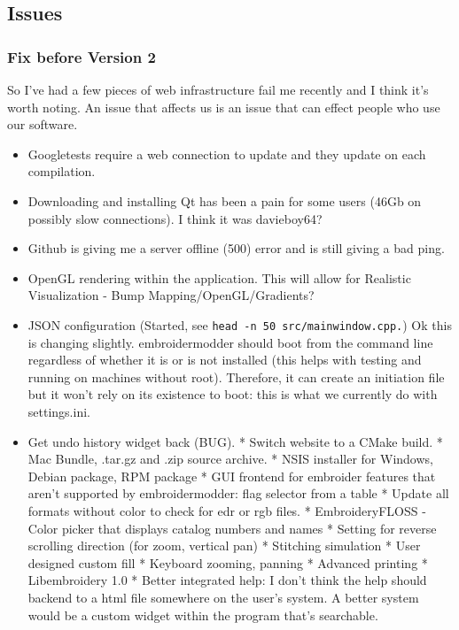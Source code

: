 \documentclass[10pt]{report}
\begin{document}
\subsection{Issues}

\subsubsection{Fix before Version 2}

So I've had a few pieces of web infrastructure fail me recently and I
think it's worth noting. An issue that affects us is an issue that can
effect people who use our software.

\begin{itemize}
\item Googletests require a web connection to update and they update on each
      compilation.
\item Downloading and installing Qt has been a pain for some users (46Gb on
      possibly slow connections). I think it was davieboy64?
\item Github is giving me a server offline (500) error and is still giving a bad
      ping.
\item OpenGL rendering within the application. This will allow for Realistic
      Visualization - Bump Mapping/OpenGL/Gradients?
\item JSON configuration (Started, see \texttt{head\ -n\ 50\ src/mainwindow.cpp.})
      Ok this is changing slightly. embroidermodder should boot from the command
      line regardless of whether it is or is not installed (this helps with
      testing and running on machines without root). Therefore, it can create
      an initiation file but it won't rely on its existence to boot: this is
      what we currently do with settings.ini.
\item Get undo history widget back (BUG).
* Switch website to a CMake build.
* Mac Bundle, .tar.gz and .zip source archive.
* NSIS installer for Windows, Debian package, RPM package
* GUI frontend for embroider features that aren't supported by  embroidermodder: flag selector from a table
* Update all formats without color to check for edr or rgb files.
* EmbroideryFLOSS - Color picker that displays catalog numbers and names
* Setting for reverse scrolling direction (for zoom, vertical pan)
* Stitching simulation
* User designed custom fill
* Keyboard zooming, panning
* Advanced printing
* Libembroidery 1.0
* Better integrated help: I don't think the help should backend to a html file somewhere on the user's system. A better system would be a custom widget within the program that's searchable.

\end{itemize}
\end{document}
